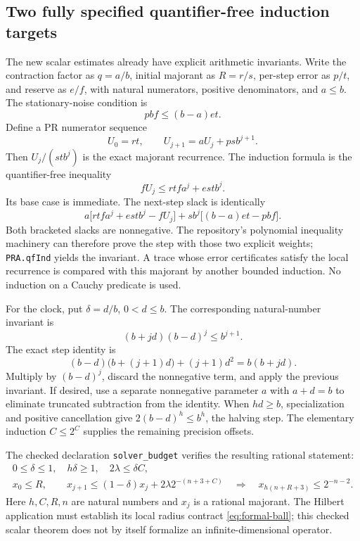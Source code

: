 \subsection{Two fully specified quantifier-free induction targets}

The new scalar estimates already have explicit arithmetic invariants.
Write the contraction factor as \(q=a/b\), initial majorant as \(R=r/s\),
per-step error as \(p/t\), and reserve as \(e/f\), with natural numerators,
positive denominators, and \(a\leq b\). The stationary-noise condition is
\[
                    pbf\leq(b-a)et.
\]
Define a PR numerator sequence
\[
 U_0=rt,\qquad U_{j+1}=aU_j+psb^{j+1}.
\]
Then \(U_j/(stb^j)\) is the exact majorant recurrence. The induction formula
is the quantifier-free inequality
\[
              fU_j\leq rtf a^j+est b^j.
 \tag{F2}\label{eq:formal-noise-invariant}
\]
Its base case is immediate. The next-step slack is identically
\[
 a\bigl[rtf a^j+estb^j-fU_j\bigr]
       +sb^j\bigl[(b-a)et-pbf\bigr].
\]
Both bracketed slacks are nonnegative. The repository's polynomial
inequality machinery can therefore prove the step with those two explicit
weights; \texttt{PRA.qfInd} yields the invariant. A trace whose error
certificates satisfy the local recurrence is compared with this majorant
by another bounded induction. No induction on a Cauchy predicate is used.

For the clock, put \(\delta=d/b\), \(0<d\leq b\). The corresponding
natural-number invariant is
\[
             (b+jd)(b-d)^j\leq b^{j+1}.
 \tag{F3}\label{eq:formal-clock-invariant}
\]
The exact step identity is
\[
 (b-d)\bigl(b+(j+1)d\bigr)+(j+1)d^2=b(b+jd).
\]
Multiply by \((b-d)^j\), discard the nonnegative term, and apply the
previous invariant. If desired, use a separate nonnegative parameter
\(a\) with \(a+d=b\) to eliminate truncated subtraction from the identity.
When \(hd\geq b\), specialization and positive cancellation give
\(2(b-d)^h\leq b^h\), the halving step. The elementary induction
\(C\leq2^C\) supplies the remaining precision offsets.

The checked declaration \texttt{solver\_budget} verifies the resulting
rational statement:
\[
\begin{gathered}
 0\leq\delta\leq1,\quad h\delta\geq1,\quad2\lambda\leq\delta C,\\
 x_0\leq R,\qquad
 x_{j+1}\leq(1-\delta)x_j+2\lambda2^{-(n+3+C)}
 \quad\Longrightarrow\quad
 x_{h(n+R+3)}\leq2^{-n-2}.
\end{gathered}
\]
Here \(h,C,R,n\) are natural numbers and \(x_j\) is a rational majorant.
The Hilbert application must establish its local radius contract
\eqref{eq:formal-ball}; this checked scalar theorem does not by itself
formalize an infinite-dimensional operator.

